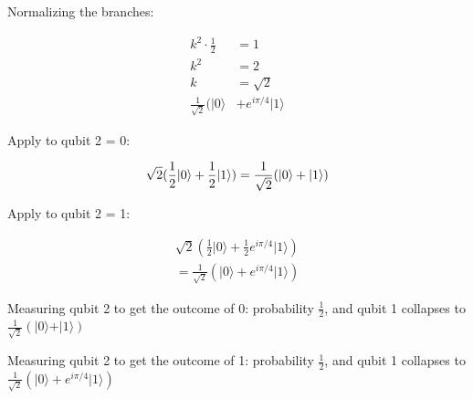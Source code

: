 \documentclass[10pt]{article}
\newcommand{\ket}[1]{\vert #1 \rangle}
\begin{document}
\begin{enumerate}
\begin{enumerate}
          Normalizing the branches:

          \begin{align*}
            k^2 \cdot \frac12 &= 1 \\
            k^2 &= 2 \\
            k &= \sqrt2 \\
            \frac{1}{\sqrt2}(\ket{0} &+ e^{i\pi/4}\ket{1}
          \end{align*}

          Apply to qubit 2 = 0:

          \begin{equation*}
            \sqrt2 (\frac12 \ket{0} + \frac12 \ket{1}) \\= \frac{1}{\sqrt2} (\ket{0} + \ket{1})
          \end{equation*}

          Apply to qubit 2 = 1:

          \begin{align*}
            \sqrt2 (\frac12 \ket{0} + \frac12 e^{i\pi/4} \ket{1}) \\= \frac{1}{\sqrt2} (\ket{0} + e^{i\pi/4} \ket{1})
          \end{align*}

          Measuring qubit 2 to get the outcome of 0: probability $\frac12$, and qubit 1 collapses to $\frac{1}{\sqrt2} (\ket{0} + \ket{1})$

          Measuring qubit 2 to get the outcome of 1: probability $\frac12$, and qubit 1 collapses to $\frac{1}{\sqrt2} (\ket{0} + e^{i\pi/4} \ket{1})$
          

      \end{enumerate}
    
\end{enumerate}
\end{document}
